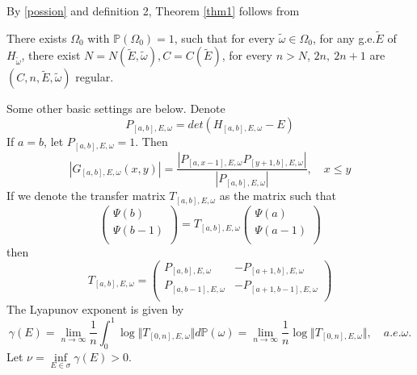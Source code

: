 By \eqref{possion} and definition 2, Theorem  \ref{thm1} follows from
\begin{thm}\label{thm2}
  There exists $ \Omega_0$ with $\mathbb{P}(\Omega_0)=1$, such that for every $ \tilde{\omega}\in\Omega_0$, for any g.e.$\tilde{E}$ of $H_{\tilde{\omega}}$, there exist $ N=N(\tilde{E},\tilde{\omega}),C=C(\tilde{E})$, for every $ n>N$, $2n,~2n+1$ are $(C,n,\tilde{E},\tilde{\omega})$ regular.
\end{thm}

Some other basic settings are below. Denote
\[
  P_{[a,b],E,\omega}=det(H_{[a,b],E,\omega}-E)
\]
If $a=b$, let $  P_{[a,b],E,\omega}=1$. Then
\begin{equation}\label{A}
  \left\vert G_{[a,b],E,\omega}(x,y)\right\vert=\frac{\left\vert P_{[a,x-1],E,\omega}P_{[y+1,b],E,\omega}\right\vert}{\left\vert P_{[a,b],E,\omega}\right\vert},\quad x\leq y
\end{equation}
If we denote the transfer matrix $T_{[a,b],E,\omega}$ as the matrix such that
\[
\left(
\begin{array}{c}
  \Psi(b)\\
  \Psi(b-1)\\
\end{array}
\right)
=T_{[a,b],E,\omega} \left(
\begin{array}{c}
  \Psi(a)\\
  \Psi(a-1)\\
\end{array}
\right)
\]
then
\[
T_{[a,b],E,\omega}=\left(
  \begin{array}{cc}
    P_{[a,b],E,\omega} & -P_{[a+1,b],E,\omega}\\
    P_{[a,b-1],E,\omega} & -P_{[a+1,b-1],E,\omega}\\
  \end{array}
  \right)
\]
The Lyapunov exponent is given by
  \[
    \gamma(E)=\lim_{n\to\infty}\frac{1}{n}\int_0^1 \log\Vert T_{[0,n],E,\omega}\Vert d\mathbb{P}(\omega)=\lim_{n\rightarrow\infty}\frac{1}{n} \log\Vert T_{[0,n],E,\omega}\Vert, \quad a.e.\omega.
  \]
Let $\nu=\inf\limits_{E\in \sigma}\gamma(E)>0$.

